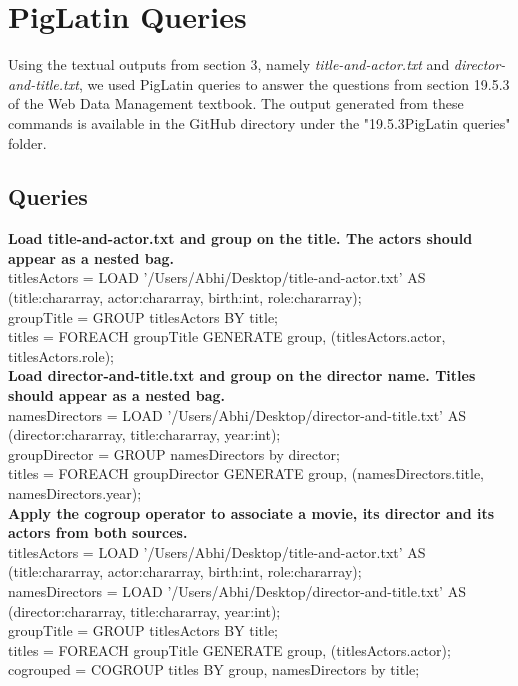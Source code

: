 \documentclass[Piglatin.tex]{subfiles}
\begin{document}
\section{PigLatin Queries}
Using the textual outputs from section 3, namely \textit{title-and-actor.txt} and \textit{director-and-title.txt}, we used PigLatin queries to answer the questions from section 19.5.3 of the Web Data Management textbook. The output generated from these commands is available in the GitHub directory under the "19.5.3PigLatin queries" folder.

\subsection{Queries}

\textbf{Load title-and-actor.txt and group on the title. The actors should appear as a nested bag.} \\
titlesActors = LOAD '/Users/Abhi/Desktop/title-and-actor.txt' AS (title:chararray, actor:chararray, birth:int, role:chararray); \\
groupTitle = GROUP titlesActors BY title;  \\
titles = FOREACH groupTitle GENERATE group, (titlesActors.actor, titlesActors.role); \\

\textbf{Load director-and-title.txt and group on the director name. Titles should appear as a nested bag.} \\
namesDirectors = LOAD '/Users/Abhi/Desktop/director-and-title.txt' AS (director:chararray, title:chararray, year:int); \\
groupDirector = GROUP namesDirectors by director;  \\
titles = FOREACH groupDirector GENERATE group, (namesDirectors.title, namesDirectors.year);  \\

\textbf{Apply the cogroup operator to associate a movie, its director and its actors from both sources.} \\
titlesActors = LOAD '/Users/Abhi/Desktop/title-and-actor.txt' AS (title:chararray, actor:chararray, birth:int, role:chararray);  \\
namesDirectors = LOAD '/Users/Abhi/Desktop/director-and-title.txt' AS (director:chararray, title:chararray, year:int); \\
groupTitle = GROUP titlesActors BY title; \\
titles = FOREACH groupTitle GENERATE group, (titlesActors.actor); \\
cogrouped = COGROUP titles BY group, namesDirectors by title; \\
\end{document}
